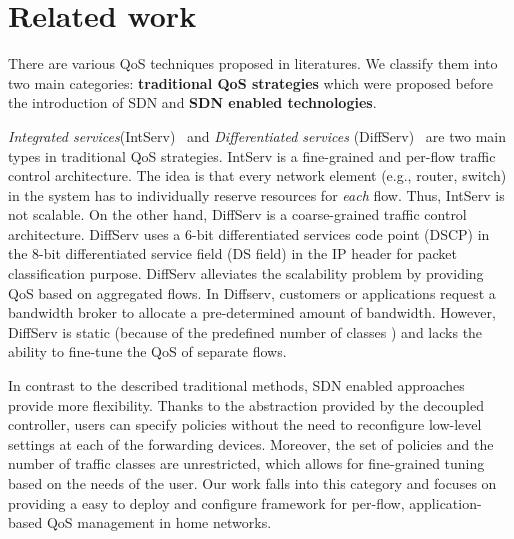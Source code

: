 \section{Related work}
\label{sect:related}

There are various QoS techniques  proposed in literatures. We classify them into two main
categories: \textbf{traditional QoS strategies} which were proposed before the introduction of SDN and
\textbf{SDN enabled technologies}.

\emph{Integrated services}(IntServ)~\cite{IntServ} and \emph{Differentiated services} (DiffServ)~\cite{DiffServ}
are two main types in traditional QoS strategies. IntServ is a fine-grained and per-flow traffic control architecture.
The idea is that every network element (e.g., router, switch) in the system has to individually reserve resources for
\emph{each} flow. Thus, IntServ is not scalable. On the other hand, DiffServ is a coarse-grained traffic control
architecture. DiffServ uses a 6-bit differentiated services code point (DSCP) in the 8-bit differentiated service field
(DS field) in the IP header for packet classification purpose. DiffServ alleviates the scalability problem by providing
QoS based on aggregated flows.  In Diffserv, customers or applications request a bandwidth broker to allocate a pre-determined
amount of bandwidth. However, DiffServ is static (because of the predefined number of classes ) and lacks the ability to
fine-tune the QoS of separate flows.

In contrast to the described traditional methods, SDN enabled approaches provide more flexibility. Thanks to the abstraction
provided by the decoupled controller, users can specify policies without the need to reconfigure low-level settings at each
of the forwarding devices. Moreover, the set of policies and the number of traffic classes are unrestricted, which allows for
fine-grained tuning based on the needs of the user. Our work falls into this category and focuses on providing a easy to deploy
and configure framework for per-flow, application-based QoS management in home networks.

